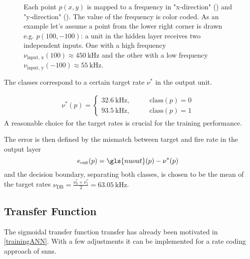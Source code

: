 \begin{figure}
	\begin{subfigure}[c]{0.5\textwidth}
		\centering
		\caption{}
		\label{nuxinput}
	\end{subfigure}
	\begin{subfigure}[c]{0.5\textwidth}
		\centering
		\caption{}
		\label{nuyinput}
	\end{subfigure}
	\caption{Each point $p(x,y)$ is mapped to a frequency in "x-direction" () and "y-direction" (). The value of the frequency is color coded. As an example let's assume a point from the lower right corner is drawn e.g. $p(100,-100)$: a unit in the hidden layer receives two independent inputs. One with a high frequency $\nu_{\text{input, x}}(100) \approx \SI{450}{\kilo \Hz}$ and the other with a low frequency $\nu_{\text{input, y}}(-100) \approx \SI{55}{\kilo \Hz}$.}
	\label{circlesinputs}

\end{figure}

The classes correspond to a certain target rate $\nu^*$ in the output unit.

\begin{align}
\label{circlestarget}
\nu^*(p) =
\begin{cases}
\SI{32.6}{\kilo \Hz} ,&\quad \quad \text{class}(p) = 0\\
\SI{93.5}{\kilo \Hz} ,&\quad \quad \text{class}(p) = 1
\end{cases}
\end{align}
A reasonable choice for the target rates is crucial for the training performance.

The error is then defined by the mismatch between target and fire rate in the output layer
\begin{equation}
e_\text{out}(p) = \gls{nuout}(p) - \nu^*(p)
\end{equation}
and the decision boundary, separating both classes, is chosen to be the mean of the target rates $\nu_\text{DB} = \frac{\nu_0^* + \nu_1^*}{2} = \SI{63.05}{\kilo \Hz}$.

\subsection{Transfer Function}

The sigmoidal transfer function \gls{transfer} has already been motivated in \cref{trainingANN}. With a few adjustments it can be implemented for a rate coding approach of \glspl{snn}.

